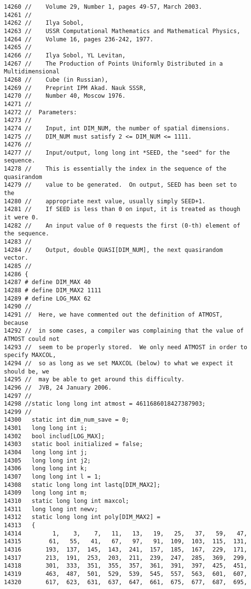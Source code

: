 \begin{Code}
\begin{verbatim}
14260 //    Volume 29, Number 1, pages 49-57, March 2003.
14261 //
14262 //    Ilya Sobol,
14263 //    USSR Computational Mathematics and Mathematical Physics,
14264 //    Volume 16, pages 236-242, 1977.
14265 //
14266 //    Ilya Sobol, YL Levitan, 
14267 //    The Production of Points Uniformly Distributed in a Multidimensional 
14268 //    Cube (in Russian),
14269 //    Preprint IPM Akad. Nauk SSSR, 
14270 //    Number 40, Moscow 1976.
14271 //
14272 //  Parameters:
14273 //
14274 //    Input, int DIM_NUM, the number of spatial dimensions.
14275 //    DIM_NUM must satisfy 2 <= DIM_NUM <= 1111.
14276 //
14277 //    Input/output, long long int *SEED, the "seed" for the sequence.
14278 //    This is essentially the index in the sequence of the quasirandom
14279 //    value to be generated.  On output, SEED has been set to the
14280 //    appropriate next value, usually simply SEED+1.
14281 //    If SEED is less than 0 on input, it is treated as though it were 0.
14282 //    An input value of 0 requests the first (0-th) element of the sequence.
14283 //
14284 //    Output, double QUASI[DIM_NUM], the next quasirandom vector.
14285 //
14286 {
14287 # define DIM_MAX 40
14288 # define DIM_MAX2 1111
14289 # define LOG_MAX 62
14290 //
14291 //  Here, we have commented out the definition of ATMOST, because
14292 //  in some cases, a compiler was complaining that the value of ATMOST could not
14293 //  seem to be properly stored.  We only need ATMOST in order to specify MAXCOL,
14294 //  so as long as we set MAXCOL (below) to what we expect it should be, we
14295 //  may be able to get around this difficulty.
14296 //  JVB, 24 January 2006.
14297 //
14298 //static long long int atmost = 4611686018427387903;
14299 //
14300   static int dim_num_save = 0;
14301   long long int i;
14302   bool includ[LOG_MAX];
14303   static bool initialized = false;
14304   long long int j;
14305   long long int j2;
14306   long long int k;
14307   long long int l = 1;
14308   static long long int lastq[DIM_MAX2];
14309   long long int m;
14310   static long long int maxcol;
14311   long long int newv;
14312   static long long int poly[DIM_MAX2] =
14313   {
14314         1,    3,    7,   11,   13,   19,   25,   37,   59,   47,
14315        61,   55,   41,   67,   97,   91,  109,  103,  115,  131,
14316       193,  137,  145,  143,  241,  157,  185,  167,  229,  171,
14317       213,  191,  253,  203,  211,  239,  247,  285,  369,  299,
14318       301,  333,  351,  355,  357,  361,  391,  397,  425,  451,
14319       463,  487,  501,  529,  539,  545,  557,  563,  601,  607,
14320       617,  623,  631,  637,  647,  661,  675,  677,  687,  695, 

\end{verbatim}
\end{Code}

